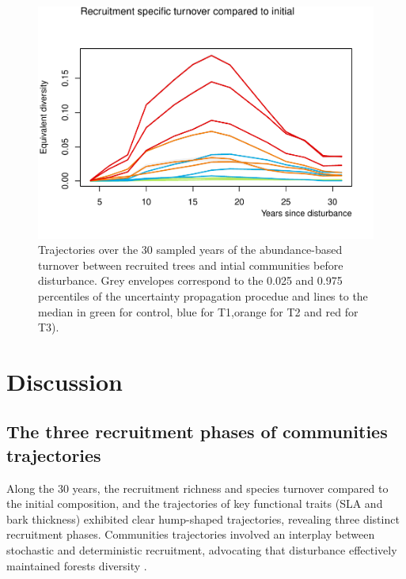 \documentclass[fleqn,10pt]{ArtEcoFoG} %
\begin{document}
\begin{figure}

{\centering \includegraphics{RecruitmentTrajectories_files/figure-latex/Turnover-1} 

}

\caption{Trajectories over the 30 sampled years of the abundance-based turnover between recruited trees and intial communities before disturbance. Grey envelopes correspond to the 0.025 and 0.975 percentiles of the uncertainty propagation procedue and lines to the median in green for control, blue for T1,orange for T2 and red for T3).}\label{fig:Turnover}
\end{figure}

\section{Discussion}\label{discussion}

\subsection{The three recruitment phases of communities
trajectories}\label{the-three-recruitment-phases-of-communities-trajectories}

Along the 30 years, the recruitment richness and species turnover
compared to the initial composition, and the trajectories of key
functional traits (SLA and bark thickness) exhibited clear hump-shaped
trajectories, revealing three distinct recruitment phases. Communities
trajectories involved an interplay between stochastic and deterministic
recruitment, advocating that disturbance effectively maintained forests
diversity \citep{Molino2001, Sheil2003}.
\end{document}
